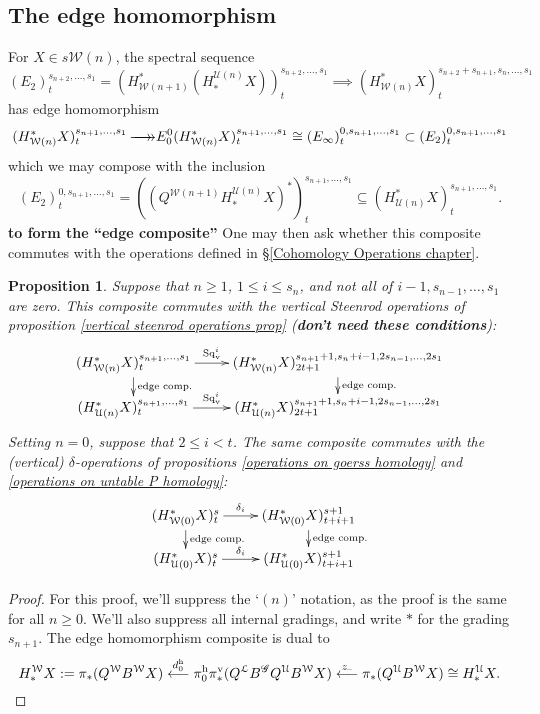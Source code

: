 \documentclass[11pt]{amsart}
\theoremstyle{plain}
\newtheorem{prop}[thm]{Proposition}
\theoremstyle{definition}
\newcommand{\DASH}{\textup{--}}
\renewcommand{\to}{\longrightarrow}
\newcommand{\from}{\longleftarrow}
\newcommand{\scrG}{\mathscr{G}}
\newcommand{\calW}{\mathcal{W}}
\newcommand{\calU}{\mathcal{U}}
\newcommand{\calL}{\mathcal{L}}
\theoremstyle{plain}
\newcommand{\BSW}{{\scrG}}
\newcommand{\epi}{{\,\makebox[0cm][l]{\ensuremath\to}\to}}
\newcommand{\Sq}{\mathrm{Sq}}
\begin{document}
\begin{Composite functor spectral sequences}
\subsection{The edge homomorphism}
For $X\in s\calW(n)$, the spectral sequence
\[(E_2)^{s_{n+2},\ldots,s_1}_t=(H^*_{\calW(n+1)}(H_*^{\calU(n)}X))^{s_{n+2},\ldots,s_1}_t\implies (H^*_{\calW(n)}X)^{s_{n+2}+s_{n+1},s_n,\ldots,s_1}_t\]
has edge homomorphism
\[(H^*_{\calW(n)}X)^{s_{n+1},\ldots,s_{1}}_t\epi
E_0^{0}(H^*_{\calW(n)}X)^{s_{n+1},\ldots,s_{1}}_t\cong (E_\infty)^{0,s_{n+1},\ldots,s_1}_t\subset (E_2)^{0,s_{n+1},\ldots,s_1}_t\]
which we may compose with the inclusion
\[(E_2)^{0,s_{n+1},\ldots,s_1}_t=((Q^{\calW(n+1)}H_*^{\calU(n)}X)^*)^{s_{n+1},\ldots,s_1}_t\subseteq (H^*_{\calU(n)}X)^{s_{n+1},\ldots,s_1}_t.\]
\textbf{to form the ``edge composite''}
One may then ask whether this composite commutes with the operations defined in \S\ref{Cohomology Operations chapter}.
\begin{prop}\label{edgehomproposition}
Suppose that $n\geq1$, $1\leq i \leq s_n$, and not all of $i-1,s_{n-1},\ldots,s_1$ are zero. This composite commutes with the vertical Steenrod operations of proposition \ref{vertical steenrod operations prop} (\textbf{don't need these conditions}):
\[\xymatrix@R=4mm{
(H^*_{\calW(n)}X)^{s_{n+1},\ldots,s_1}_t\ar[r]^-{\Sq_\textup{v}^i}
\ar[d]^-{\textup{edge comp.}}
&%
(H^*_{\calW(n)}X)^{s_{n+1}+1,s_n+i-1,2s_{n-1},\ldots,2s_1}_{2t+1}\ar[d]^-{\textup{edge comp.}}
\\%
(H^*_{\calU(n)}X)^{s_{n+1},\ldots,s_1}_t\ar[r]^-{\Sq_\textup{v}^i}
&%
(H^*_{\calU(n)}X)^{s_{n+1}+1,s_n+i-1,2s_{n-1},\ldots,2s_1}_{2t+1}
}\]
Setting $n=0$, suppose that $2\leq i <t$. The same composite commutes with the (vertical) $\delta$-operations of propositions \ref{operations on goerss homology} and \ref{operations on untable P homology}:
\[\xymatrix@R=4mm{
(H^*_{\calW(0)}X)^{s}_t\ar[r]^-{\delta_i}
\ar[d]^-{\textup{edge comp.}}
&%
(H^*_{\calW(0)}X)^{s+1}_{t+i+1}\ar[d]^-{\textup{edge comp.}}
\\%
(H^*_{\calU(0)}X)^{s}_t\ar[r]^-{\delta_i}
&%
(H^*_{\calU(0)}X)^{s+1}_{t+i+1}
}\]
\end{prop}
\begin{proof}For this proof, we'll suppress the `$(n)$' notation, as the proof is the same for all $n\geq0$. We'll also suppress all internal gradings, and write $*$ for the grading $s_{n+1}$. The edge homomorphism composite is dual to
\[H_*^{\calW}X:=\pi_*(Q^{\calW}B^{\calW}X)\overset{d_0^\textup{h}}{\from}\pi_0^\textup{h}\pi_*^\textup{v}(Q^{\calL}B^{\BSW} Q^{\calU}B^{\calW}X)\overset{z_{\DASH}}{\from}\pi_*(Q^{\calU}B^{\calW}X)\cong H_*^{\calU}X.\]

\end{proof}
\end{Composite functor spectral sequences}
\end{document}
